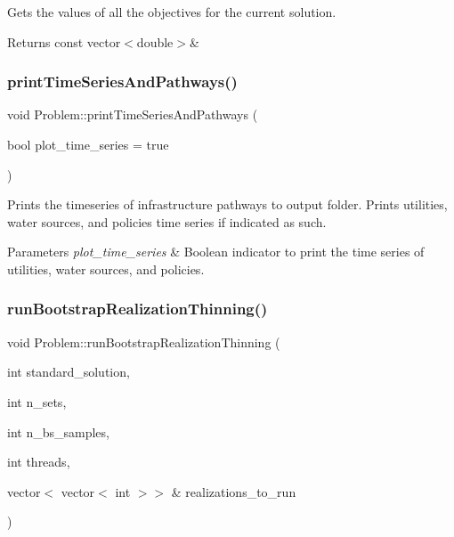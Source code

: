 Gets the values of all the objectives for the current solution. 

\begin{DoxyReturn}{Returns}
const vector$<$double$>$\& 
\end{DoxyReturn}
\mbox{\label{classProblem_a9085e0730845262a8a7b9dc26f5f84a1}} 
\subsubsection{\texorpdfstring{print\+Time\+Series\+And\+Pathways()}{printTimeSeriesAndPathways()}}
{\footnotesize\ttfamily void Problem\+::print\+Time\+Series\+And\+Pathways (\begin{DoxyParamCaption}\item[{bool}]{plot\+\_\+time\+\_\+series = {\ttfamily true} }\end{DoxyParamCaption})}



Prints the timeseries of infrastructure pathways to output folder. Prints utilities, water sources, and policies\textquotesingle{} time series if indicated as such. 


\begin{DoxyParams}{Parameters}
{\em plot\+\_\+time\+\_\+series} & Boolean indicator to print the time series of utilities, water sources, and policies. \\
\hline
\end{DoxyParams}
\mbox{\label{classProblem_a3604aafc0cf731fc9dfa8589ec8995ce}} 
\subsubsection{\texorpdfstring{run\+Bootstrap\+Realization\+Thinning()}{runBootstrapRealizationThinning()}}
{\footnotesize\ttfamily void Problem\+::run\+Bootstrap\+Realization\+Thinning (\begin{DoxyParamCaption}\item[{int}]{standard\+\_\+solution,  }\item[{int}]{n\+\_\+sets,  }\item[{int}]{n\+\_\+bs\+\_\+samples,  }\item[{int}]{threads,  }\item[{vector$<$ vector$<$ int $>$$>$ \&}]{realizations\+\_\+to\+\_\+run }\end{DoxyParamCaption})}




